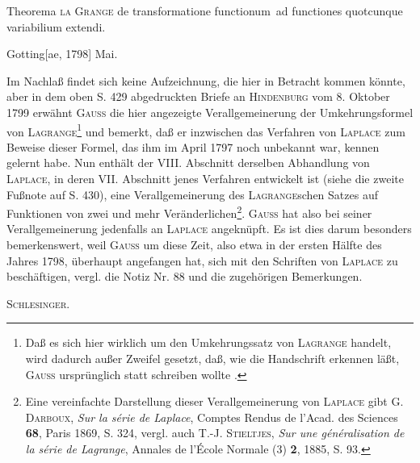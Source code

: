 \clearpage{}
\begingroup\renewcommand{\thefootnote}{[*)]}
\indent Theorema \textsc{la Grange} de transformatione functionum\footnotemark\ ad functiones quotcunque variabilium extendi.
\renewcommand{\thefootnote}{[*)}
\footnotetext{In der Handschrift steht \textls[120]{functionem}.]}
\par\noindent\hfill Gotting[ae, 1798] Mai.
\par\endgroup

\medskip\begingroup\small
\renewcommand{\thefootnote}{**)}
\indent Im Nachlaß findet sich keine Aufzeichnung, die hier in Betracht kommen könnte, aber in dem oben S. 429 abgedruckten Briefe an \textsc{Hindenburg} vom 8. Oktober 1799 erwähnt \textsc{Gauss} die hier angezeigte Verallgemeinerung der Umkehrungsformel von \textsc{Lagrange}\footnote{Daß es sich hier wirklich um den Umkehrungssatz von \textsc{Lagrange} handelt, wird dadurch außer Zweifel gesetzt, daß, wie die Handschrift erkennen läßt, \textsc{Gauss} ursprünglich statt  schreiben wollte .} und bemerkt, daß er inzwischen das Verfahren von \textsc{Laplace} zum Beweise dieser Formel, das ihm im April 1797 noch unbekannt war, kennen gelernt habe. Nun enthält der VIII. Abschnitt derselben Abhandlung von \textsc{Laplace}, in deren VII. Abschnitt jenes Verfahren entwickelt ist (siehe die zweite Fußnote auf S. 430), eine Verallgemeinerung des \textsc{Lagrange}schen Satzes auf Funktionen von zwei und mehr Veränderlichen\begingroup\renewcommand{\thefootnote}{***)}\footnote{Eine vereinfachte Darstellung dieser Verallgemeinerung von \textsc{Laplace} gibt G. \textsc{Darboux}, \textit{Sur la série de Laplace}, Comptes Rendus de l'Acad. des Sciences \textbf{68}, Paris 1869, S. 324, vergl. auch T.-J. \textsc{Stieltjes}, \textit{Sur une généralisation de la série de Lagrange}, Annales de l'École Normale (3) \textbf{2}, 1885, S. 93.}\endgroup. \textsc{Gauss} hat also bei seiner Verallgemeinerung jedenfalls an \textsc{Laplace} angeknüpft. Es ist dies darum besonders bemerkenswert, weil \textsc{Gauss} um diese Zeit, also etwa in der ersten Hälfte des Jahres 1798, überhaupt angefangen hat, sich mit den Schriften von \textsc{Laplace} zu beschäftigen, vergl. die Notiz Nr. 88 und die zugehörigen Bemerkungen.
\par\noindent\hfill\textsc{Schlesinger.}
\par\endgroup
